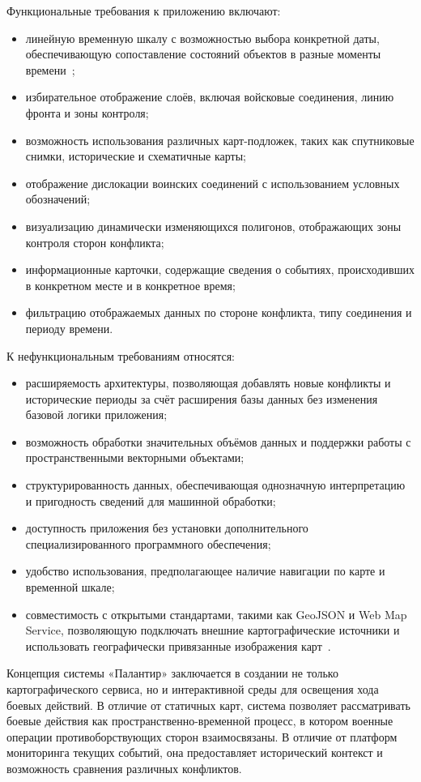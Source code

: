 Функциональные требования к приложению включают:
\begin{itemize}
\item линейную временную шкалу с возможностью выбора конкретной даты, обеспечивающую сопоставление состояний объектов в разные моменты времени~\cite{aigner_time_oriented_data};
\item избирательное отображение слоёв, включая войсковые соединения, линию фронта и зоны контроля;
\item возможность использования различных карт-подложек, таких как спутниковые снимки, исторические и схематичные карты;
\item отображение дислокации воинских соединений с использованием условных обозначений;
\item визуализацию динамически изменяющихся полигонов, отображающих зоны контроля сторон конфликта;
\item информационные карточки, содержащие сведения о событиях, происходивших в конкретном месте и в конкретное время;
\item фильтрацию отображаемых данных по стороне конфликта, типу соединения и периоду времени.
\end{itemize}

К нефункциональным требованиям относятся:
\begin{itemize}
\item расширяемость архитектуры, позволяющая добавлять новые конфликты и исторические периоды за счёт расширения базы данных без изменения базовой логики приложения;
\item возможность обработки значительных объёмов данных и поддержки работы с пространственными векторными объектами;
\item структурированность данных, обеспечивающая однозначную интерпретацию и пригодность сведений для машинной обработки;
\item доступность приложения без установки дополнительного специализированного программного обеспечения;
\item удобство использования, предполагающее наличие навигации по карте и временной шкале;
\item совместимость с открытыми стандартами, такими как GeoJSON и Web Map Service, позволяющую подключать внешние картографические источники и использовать географически привязанные изображения карт~\cite{rfc7946,ogc_wms}.
\end{itemize}

Концепция системы «Палантир» заключается в создании не только картографического сервиса, но и интерактивной среды для освещения хода боевых действий. В отличие от статичных карт, система позволяет рассматривать боевые действия как пространственно-временной процесс, в котором военные операции противоборствующих сторон взаимосвязаны. В отличие от платформ мониторинга текущих событий, она предоставляет исторический контекст и возможность сравнения различных конфликтов.

